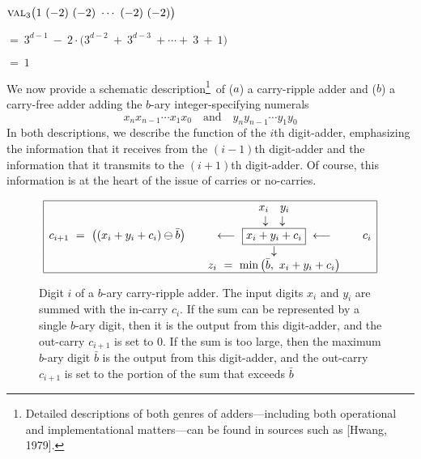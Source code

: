 \smallskip

$\displaystyle \mbox{\sc val}_3 \big( 1 \ (-2) \ (-2) \ \cdots \ (-2) \ (-2) \big)$

\smallskip

\hspace*{.25in}$= \ 3^{d-1} \ - \ 2 \cdot \big(3^{d-2} \ + \ 3^{d-3} \ + \cdots + \ 3 \ + \ 1 \big)$

\hspace*{.25in}$= \ 1$

\bigskip

We now provide a schematic description\footnote{Detailed descriptions of both genres of adders---including both operational and implementational matters---can be found in sources such as [Hwang, 1979].}~of ($a$) a carry-ripple adder and ($b$) a carry-free adder adding the $b$-ary integer-specifying numerals
\[ x_n x_{n-1} \cdots x_1 x_0 \ \ \ \mbox{ and } \ \ \ 
y_n y_{n-1} \cdots y_1 y_0
\]
In both descriptions, we describe the function of the $i$th digit-adder, emphasizing the information that it receives from the $(i-1)$th digit-adder and the information that it transmits to the $(i+1)$th digit-adder.  Of course, this information is at the heart of the issue of carries or no-carries.

\begin{figure}[hbt]
\[
\begin{array}{|lcccr|}
\hline
 & & x_i \ \ \ y_i & & \\
 & & \downarrow \ \ \ \downarrow & & \\
c_{i+1} \ = \ \big( (x_i + y_i + c_i) \ominus \bar{b} \big)
 & & \longleftarrow \ \fbox{$x_i + y_i + c_i$} \ \longleftarrow & &  c_i 
  \\
 & & \downarrow & &
  \\
 & & z_i \ = \ \min \big( \bar{b}, \ x_i + y_i + c_i \big)  & & 
  \\
\hline
\end{array}
\]
\caption{Digit $i$ of a $b$-ary carry-ripple adder.  The input digits $x_i$ and $y_i$ are summed with the in-carry $c_i$.  If the sum can be represented by a single $b$-ary digit, then it is the output from this digit-adder, and the out-carry $c_{i+1}$ is set to $0$.  If the sum is too large, then the maximum $b$-ary digit $\bar{b}$ is the output from this digit-adder, and the out-carry $c_{i+1}$ is set to the portion of the sum that exceeds $\bar{b}$}
\label{fig:carry-ripple-digit}
\end{figure}

\bigskip

